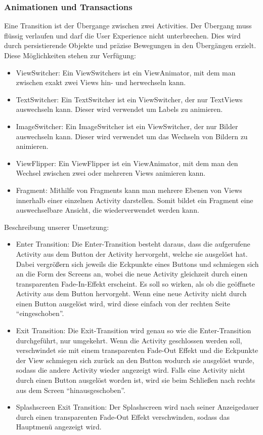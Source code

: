 \documentclass[FIPLY_base.tex]{subfiles}
\begin{document}
\subsubsection{Animationen und Transactions}
Eine Transition ist der Übergange zwischen zwei Activities.
Der Übergang muss flüssig verlaufen und darf die User Experience nicht unterbrechen. Dies wird durch persistierende Objekte und präzise Bewegungen in den Übergängen erzielt.
Diese Möglichkeiten stehen zur Verfügung:
\begin{itemize}
	\item ViewSwitcher: Ein ViewSwitchers ist ein ViewAnimator, mit dem man zwischen exakt zwei Views hin- und herwechseln kann. 
	\item TextSwitcher: Ein TextSwitcher ist ein ViewSwitcher, der nur TextViews auswechseln kann. Dieser wird verwendet um Labels zu animieren.
	\item ImageSwitcher: Ein ImageSwitcher ist ein ViewSwitcher, der nur Bilder auswechseln kann. Dieser wird verwendet um das Wechseln von Bildern zu animieren.
	\item ViewFlipper: Ein ViewFlipper ist ein ViewAnimator, mit dem man den Wechsel zwischen zwei oder mehreren Views animieren kann.
	\item Fragment: Mithilfe von Fragments kann man mehrere Ebenen von Views innerhalb einer einzelnen Activity darstellen. Somit bildet ein 
	Fragment eine auswechselbare Ansicht, die wiederverwendet werden kann.
\end{itemize}
Beschreibung unserer Umsetzung:
\begin{itemize}
	\item Enter Transition: Die Enter-Transition besteht daraus, dass die aufgerufene Activity aus dem Button der Activity hervorgeht, welche sie ausgelöst hat. Dabei vergrößern sich jeweils die Eckpunkte eines Buttons und schmiegen sich an die Form des Screens an, wobei die neue Activity gleichzeit durch einen transparenten Fade-In-Effekt erscheint. Es soll so wirken, als ob die geöffnete Activity aus dem Button hervorgeht. Wenn eine neue Activity nicht durch einen Button ausgelöst wird, wird diese einfach von der rechten Seite “eingeschoben”.
	\item Exit Transition: Die Exit-Transition wird genau so wie die Enter-Transition    durchgeführt, nur umgekehrt. Wenn die Activity geschlossen werden soll, verschwindet sie mit einem transparenten Fade-Out Effekt und die Eckpunkte der View schmiegen sich zurück an den Button wodurch sie ausgelöst wurde, sodass die andere Activity wieder angezeigt wird. Falls eine Activity nicht durch einen Button ausgelöst worden ist, wird sie beim Schließen nach rechts aus dem Screen “hinausgeschoben”.
	\item Splashscreen Exit Transition: Der Splashscreen wird nach seiner Anzeigedauer durch einen transparenten Fade-Out Effekt verschwinden, sodass das Hauptmenü angezeigt wird.
\end{itemize}
\end{document}
